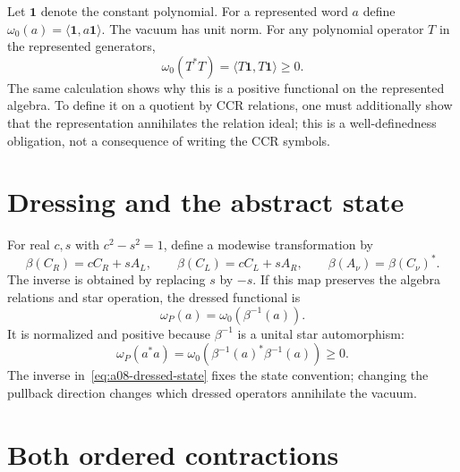 Let $\mathbf 1$ denote the constant polynomial. For a represented word $a$
define $\omega_0(a)=\langle\mathbf 1,a\mathbf 1\rangle$. The vacuum has unit
norm. For any polynomial operator $T$ in the represented generators,
\begin{equation}
 \omega_0(T^*T)=\langle T\mathbf 1,T\mathbf 1\rangle\geq0.
 \label{eq:a08-vacuum-positive}
\end{equation}
The same calculation shows why this is a positive functional on the represented
algebra. To define it on a quotient by CCR relations, one must additionally
show that the representation annihilates the relation ideal; this is a
well-definedness obligation, not a consequence of writing the CCR symbols.

\section{Dressing and the abstract state}

For real $c,s$ with $c^2-s^2=1$, define a modewise transformation by
\begin{equation}
 \beta(C_R)=cC_R+sA_L,\qquad
 \beta(C_L)=cC_L+sA_R,\qquad
 \beta(A_\nu)=\beta(C_\nu)^*.
 \label{eq:a08-beta}
\end{equation}
The inverse is obtained by replacing $s$ by $-s$. If this map preserves the
algebra relations and star operation, the dressed functional is
\begin{equation}
 \omega_P(a)=\omega_0(\beta^{-1}(a)).
 \label{eq:a08-dressed-state}
\end{equation}
It is normalized and positive because $\beta^{-1}$ is a unital star automorphism:
\begin{equation}
 \omega_P(a^*a) = \omega_0(\beta^{-1}(a)^*\beta^{-1}(a)) \ge 0.
\end{equation}
The inverse in~\eqref{eq:a08-dressed-state} fixes the state convention; changing
the pullback direction changes which dressed operators annihilate the vacuum.

\section{Both ordered contractions}

